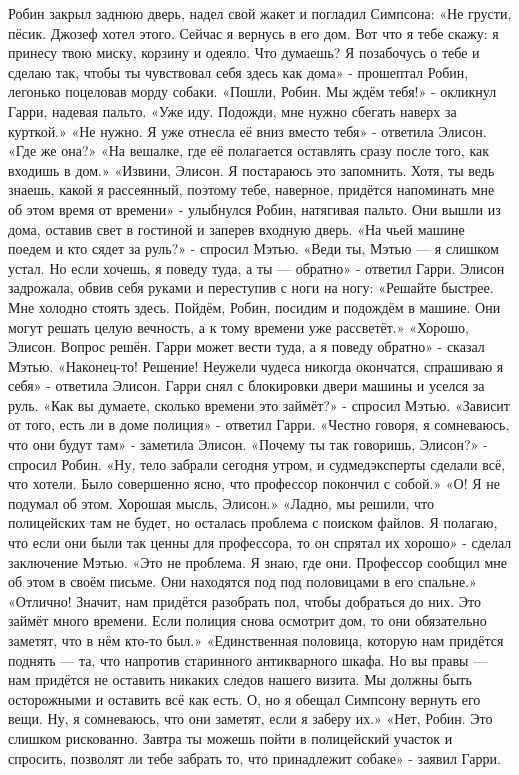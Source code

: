 \documentclass[a4paper,12pt]{book}
\begin{document}
	Робин закрыл заднюю дверь, надел свой жакет и погладил Симпсона:
	«Не грусти, пёсик. Джозеф хотел этого. Сейчас я вернусь в его дом. Вот что я тебе скажу: я принесу твою миску, корзину и одеяло. Что думаешь? Я позабочусь о тебе и сделаю так, чтобы ты чувствовал себя здесь как дома» - прошептал Робин, легонько поцеловав морду собаки.
	«Пошли, Робин. Мы ждём тебя!» - окликнул Гарри, надевая пальто.
	«Уже иду. Подожди, мне нужно сбегать наверх за курткой.»
	«Не нужно. Я уже отнесла её вниз вместо тебя» - ответила Элисон.
	«Где же она?»
	«На вешалке, где её полагается оставлять сразу после того, как входишь в дом.»
	«Извини, Элисон. Я постараюсь это запомнить. Хотя, ты ведь знаешь, какой я рассеянный, поэтому тебе, наверное, придётся напоминать мне об этом время от времени» - улыбнулся Робин, натягивая пальто.
	Они вышли из дома, оставив свет в гостиной и заперев входную дверь.
	«На чьей машине поедем и кто сядет за руль?» - спросил Мэтью.
	«Веди ты, Мэтью — я слишком устал. Но если хочешь, я поведу туда, а ты — обратно» - ответил Гарри.
	Элисон задрожала, обвив себя руками и переступив с ноги на ногу:
	«Решайте быстрее. Мне холодно стоять здесь. Пойдём, Робин, посидим и подождём в машине. Они могут решать целую вечность, а к тому времени уже рассветёт.»
	«Хорошо, Элисон. Вопрос решён. Гарри может вести туда, а я поведу обратно» - сказал Мэтью.
	«Наконец-то! Решение! Неужели чудеса никогда окончатся, спрашиваю я себя» - ответила Элисон.
	Гарри снял с блокировки двери машины и уселся за руль.
	«Как вы думаете, сколько времени это займёт?» - спросил Мэтью.
	«Зависит от того, есть ли в доме полиция» - ответил Гарри.
	«Честно говоря, я сомневаюсь, что они будут там» - заметила Элисон.
	«Почему ты так говоришь, Элисон?» - спросил Робин.
	«Ну, тело забрали сегодня утром, и судмедэксперты сделали всё, что хотели. Было совершенно ясно, что профессор покончил с собой.»
	«О! Я не подумал об этом. Хорошая мысль, Элисон.»
	«Ладно, мы решили, что полицейских там не будет, но осталась проблема с поиском файлов. Я полагаю, что если они были так ценны для профессора, то он спрятал их хорошо» - сделал заключение Мэтью.
	«Это не проблема. Я знаю, где они. Профессор сообщил мне об этом в своём письме. Они находятся под под половицами в его спальне.»
	«Отлично! Значит, нам придётся разобрать пол, чтобы добраться до них. Это займёт много времени. Если полиция снова осмотрит дом, то они обязательно заметят, что в нём кто-то был.»
	«Единственная половица, которую нам придётся поднять — та, что напротив старинного антикварного шкафа. Но вы правы — нам придётся не оставить никаких следов нашего визита. Мы должны быть осторожными и оставить всё как есть. О, но я обещал Симпсону вернуть его вещи. Ну, я сомневаюсь, что они заметят, если я заберу их.»
	«Нет, Робин. Это слишком рискованно. Завтра ты можешь пойти в полицейский участок и спросить, позволят ли тебе забрать то, что принадлежит собаке» - заявил Гарри.
\end{document}
